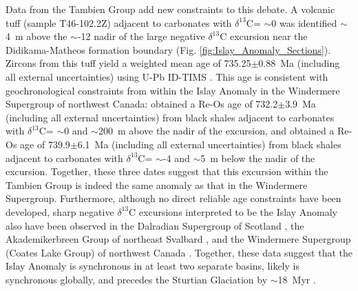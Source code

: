 \documentclass[11pt,letterpaper]{article}
\newcommand{\dC}{$\delta^{13}$C\xspace}
\newcommand{\permil}{\textperthousand\xspace}
\begin{document}
Data from the Tambien Group add new constraints to this debate. A volcanic tuff (sample T46-102.2Z) adjacent to carbonates with \dC = $\sim$0\permil was identified $\sim$4~m above the $\sim$-12\permil nadir of the large negative \dC excursion near the Didikama-Matheos formation boundary (Fig. \ref{fig:Islay_Anomaly_Sections}). Zircons from this tuff yield a weighted mean age of 735.25$\pm$0.88~Ma (including all external uncertainties) using U-Pb ID-TIMS \citep{MacLennan2018a}. This age is consistent with geochronological constraints from within the Islay Anomaly in the Windermere Supergroup of northwest Canada: \citet{Rooney2014a} obtained a Re-Os age of 732.2$\pm$3.9~Ma (including all external uncertainties) from black shales adjacent to carbonates with \dC = $\sim$0\permil and $\sim$200~m above the nadir of the excursion, and \citet{Strauss2014a} obtained a Re-Os age of 739.9$\pm$6.1~Ma (including all external uncertainties) from black shales adjacent to carbonates with \dC = $\sim$-4\permil and $\sim$5~m below the nadir of the excursion. Together, these three dates suggest that this excursion within the Tambien Group is indeed the same anomaly as that in the Windermere Supergroup. Furthermore, although no direct reliable age constraints have been developed, sharp negative \dC excursions interpreted to be the Islay Anomaly also have been observed in the Dalradian Supergroup of Scotland \citep{Sawaki2010a}, the Akademikerbreen Group of northeast Svalbard \citep{Halverson2007a, Hoffman2012a}, and the Windermere Supergroup (Coates Lake Group) of northwest Canada \citep{Halverson2006a}. Together, these data suggest that the Islay Anomaly is synchronous in at least two separate basins, likely is synchronous globally, and precedes the Sturtian Glaciation by $\sim$18~Myr \citep{MacLennan2018a}.
\end{document}
